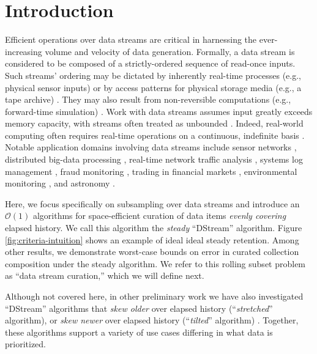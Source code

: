 \section{Introduction} \label{sec:introduction}

Efficient operations over data streams are critical in harnessing the ever-increasing volume and velocity of data generation.
Formally, a data stream is considered to be composed of a strictly-ordered sequence of read-once inputs.
Such streams' ordering may be dictated by inherently real-time processes (e.g., physical sensor inputs) or by access patterns for physical storage media (e.g., a tape archive) \citep{henzinger1998computing}.
They may also result from non-reversible computations (e.g., forward-time simulation) \citep{abdulla2004simulation,schutzel2014stream}.
Work with data streams assumes input greatly exceeds memory capacity, with streams often treated as unbounded \citep{jiang2006research}.
Indeed, real-world computing often requires real-time operations on a continuous, indefinite basis \citep{cordeiro2016online}.
Notable application domains involving data streams include sensor networks \citep{elnahrawy2003research}, distributed big-data processing \citep{he2010comet}, real-time network traffic analysis \citep{johnson2005streams,muthukrishnan2005data}, systems log management \citep{fischer2012real}, fraud monitoring \citep{rajeshwari2016real}, trading in financial markets \citep{agarwal2009faster}, environmental monitoring \citep{hill2009real}, and astronomy \citep{graham2012data}.

Here, we focus specifically on subsampling over data streams and introduce an $\mathcal{O}(1)$ algorithms for space-efficient curation of data items \textit{evenly covering} elapsed history.
We call this algorithm the \textit{steady} ``DStream'' algorithm.
Figure \ref{fig:criteria-intuition} shows an example of ideal ideal steady retention.
Among other results, we demonstrate worst-case bounds on error in curated collection composition under the steady algorithm.
We refer to this rolling subset problem as ``data stream curation,'' which we will define next.

Although not covered here, in other preliminary work we have also investigated ``DStream'' algorithms that \textit{skew older} over elapsed history (``\textit{stretched}'' algorithm), or \textit{skew newer} over elapsed history (``\textit{tilted}'' algorithm) \citep{moreno2024structured}.
Together, these algorithms support a variety of use cases differing in what data is prioritized.







